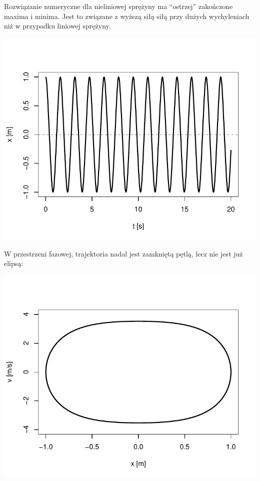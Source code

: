 \documentclass[12pt]{sprawozdanie}
\begin{document}
Rozwiązanie numeryczne dla nieliniowej sprężyny ma ``ostrzej''
zakończone maxima i minima. Jest to związane z wyższą siłą siłą przy
dużych wychyleniach niż w przypadku liniowej sprężyny.

\begin{center}\includegraphics{info2_files/figure-latex/nonlinear-solution-1} \end{center}

W przestrzeni fazowej, trajektoria nadal jest zamkniętą pętlą, lecz nie
jest już elipsą:

\begin{center}\includegraphics{info2_files/figure-latex/nonlinear-phase-1} \end{center}
\end{document}
